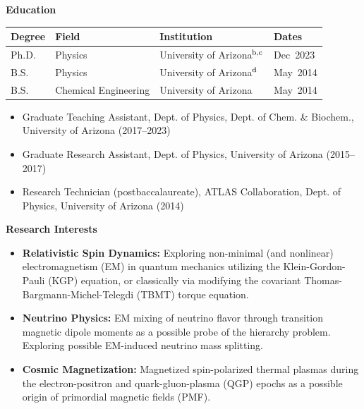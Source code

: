 \documentclass[11pt]{article}
\begin{document}
\medskip

{\Large\textbf{Education}}

{\normalsize
\begin{tabular}{@{}p{2.8cm} p{5.0cm} p{5.5cm} p{3.2cm}@{}}
    \toprule
    \textbf{Degree} & \textbf{Field} & \textbf{Institution} & \textbf{Dates} \\
    \midrule
    Ph.D. & Physics & University of Arizona\(^{\rm b,c}\) & Dec~2023 \\
    B.S. & Physics & University of Arizona\(^{\rm d}\) & May~2014 \\
    B.S. & Chemical Engineering & University of Arizona & May~2014 \\
    \bottomrule
\end{tabular}
}

\begin{itemize}[leftmargin=*,nosep]
    \item[\(^{\rm b}\)] {\small Graduate Teaching Assistant, Dept. of Physics, Dept. of Chem. \& Biochem., University of Arizona (2017--2023)}
    \item[\(^{\rm c}\)] {\small Graduate Research Assistant, Dept. of Physics, University of Arizona (2015--2017)}
    \item[\(^{\rm d}\)] {\small Research Technician (postbaccalaureate), ATLAS Collaboration, Dept. of Physics, University of Arizona (2014)}
\end{itemize}

\medskip

{\Large\textbf{Research Interests}}

\begin{itemize}[leftmargin=*,nosep]
    \item \textbf{Relativistic Spin Dynamics:} Exploring non-minimal (and nonlinear) electromagnetism (EM) in quantum mechanics utilizing the Klein-Gordon-Pauli (KGP) equation, or classically via modifying the covariant Thomas-Bargmann-Michel-Telegdi (TBMT) torque equation.
    \item \textbf{Neutrino Physics:} EM mixing of neutrino flavor through transition magnetic dipole moments as a possible probe of the hierarchy problem. Exploring possible EM-induced neutrino mass splitting.
    \item \textbf{Cosmic Magnetization:} Magnetized spin-polarized thermal plasmas during the electron-positron and quark-gluon-plasma (QGP) epochs as a possible origin of primordial magnetic fields (PMF).
\end{itemize}
\end{document}

